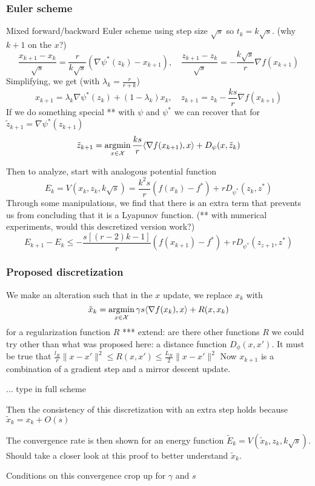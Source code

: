 \subsubsection{Euler scheme}
Mixed forward/backward Euler scheme using step size $\sqrt{s}$ so $t_k = k\sqrt{s}$. (why $k+1$ on the $x$?)
\[ \frac{x_{k+1} - x_k}{\sqrt{s}} = \frac{r}{k\sqrt{s}} (\nabla \psi^*(z_k) - x_{k+1}),\quad \frac{z_{k+1} - z_k}{\sqrt{s}} = -\frac{k\sqrt{s}}{r} \nabla f(x_{k+1}) \]
Simplifying, we get (with $\lambda_k = \frac{r}{r+k}$)
\[ x_{k+1}  = \lambda_k \nabla \psi^*(z_k) + (1-\lambda_k) x_{k}, \quad z_{k+1} = z_k -\frac{ks}{r} \nabla f(x_{k+1}) \]
If we do something special ** with $\psi$ and $\psi^*$ we can recover that for $\tilde z_{k+1} = \nabla \psi^*(z_{k+1} )$
\[ \tilde z_{k+1} = \argmin_{x\in\mathcal{X}} \frac{ks}{r} \langle \nabla f(x_{k+1}), x \rangle + D_\psi (x, \tilde z_k)\]

Then to analyze, start with analogous potential function
\[E_k = V(x_k, z_k, k\sqrt{s}) = \frac{k^2s}{r} (f(x_k) - f^*) + rD_{\psi^*}(z_k,z^*)\]
Through some manipulations, we find that there is an extra term that prevents us from concluding that it is a Lyapunov function. (** with numerical experiments, would this descretized version work?)
\[ E_{k+1} - E_k \leq -\frac{s[(r-2)k-1]}{r} (f(x_{k+1}) - f^*) + rD_{\psi^*}(z_{z+1},z^*) \]

\subsubsection{Proposed discretization}
We make an alteration such that in the $x$ update, we replace $x_k$ with 
\[\tilde x_k = \argmin_{x\in\mathcal X} \gamma s \langle \nabla f(x_k), x \rangle + R(x,x_k)  \]
for a regularization function $R$ *** extend: are there other functions $R$ we could try other than what was proposed here: a distance function $D_\phi (x,x')$. It must be true that $\frac{l_R}{r} \|x-x'\|^2 \leq R(x,x') \leq \frac{L_R}{2} \|x-x'\|^2$
Now $x_{k+1}$ is a combination of a gradient step and a mirror descent update.

... type in full scheme

Then the consistency of this discretization with an extra step holds because $\tilde x_k = x_k + O(s)$

The convergence rate is then shown for an energy function $\tilde E_k = V(\tilde x_k, z_k, k\sqrt{s})$. Should take a closer look at this proof to better understand $\tilde x_k$.

Conditions on this convergence crop up for $\gamma$ and $s$

